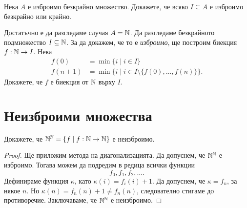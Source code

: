 \begin{problem}
  Нека $A$ е изброимо безкрайно множество.
  Докажете, че всяко $I \subseteq A$ е изброимо безкрайно или крайно.
\end{problem}
\begin{hint}
  Достатъчно е да разгледаме случая $A = \mathbb{N}$.
  Да разгледаме безкрайното подмножество $I \subseteq \mathbb{N}$.
  За да докажем, че то е {\em изброимо}, ще построим биекция $f:\mathbb{N} \to I$.
  Нека
  \begin{align*}
    f(0)   & = \min\{i \mid i \in I\}\\
    f(n+1) &= \min\{i \mid i \in I \setminus\{f(0),\dots,f(n)\}\}.
  \end{align*}
  Докажете, че $f$ е биекция от $\mathbb{N}$ върху $I$.
\end{hint}

\section{Неизброими множества}

\begin{problem}
  Докажете, че $\mathbb{N}^{\mathbb{N}} = \{f \mid f:\mathbb{N} \to \mathbb{N}\}$ е неизброимо.
\end{problem}
\begin{proof}
  Ще приложим метода на диагонализацията. 
  Да допуснем, че $\mathbb{N}^{\mathbb{N}}$ е изброимо.
  Тогава можем да подредим в редица всички функции \[f_0,f_1,f_2,\dots.\]
  Дефинираме функция $\kappa$, като $\kappa(i) = f_i(i)+1$.
  Да допуснем, че $\kappa = f_n$, за някое $n$.
  Но $\kappa(n) = f_n(n)+1 \neq f_n(n)$, следователно стигаме до противоречие.
  Заключаваме, че $\mathbb{N}^{\mathbb{N}}$ е неизброимо.
\end{proof}


